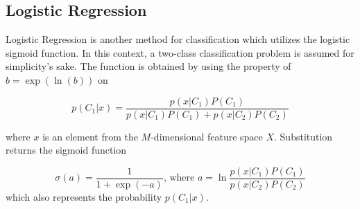 \subsection{Logistic Regression}\label{subsec:lr}
Logistic Regression is another method for classification which utilizes the logistic sigmoid function. In this context, a two-class classification problem is assumed for simplicity's sake. The function is obtained by using the property of $b = \exp(\ln(b))$ on 

\begin{equation}
	p(C_1|x)  = \frac{p(x|C_1)P(C_1)}{p(x|C_1)P(C_1)+p(x|C_2)P(C_2)}
\end{equation}

where $x$ is an element from the $M$-dimensional feature space $X$. Substitution returns the sigmoid function 

\begin{equation} \label{eq:sigmoid}
\sigma(a) = \frac{1}{1 + \exp(-a)} \text{, where } a = \ln\frac{p(x|C_1)P(C_1)}{p(x|C_2)P(C_2)}
\end{equation}
which also represents the probability $p(C_1|x)$. 

